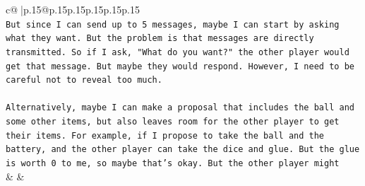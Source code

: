 \documentclass{article}
\begin{document}
{\begin{supertabular}{c@{$\;$}|p{.15\linewidth}@{}p{.15\linewidth}p{.15\linewidth}p{.15\linewidth}p{.15\linewidth}p{.15\linewidth}}
{{{\\ 
\texttt{But since I can send up to 5 messages, maybe I can start by asking what they want. But the problem is that messages are directly transmitted. So if I ask, "What do you want?" the other player would get that message. But maybe they would respond. However, I need to be careful not to reveal too much.} \\
\\ 
\texttt{Alternatively, maybe I can make a proposal that includes the ball and some other items, but also leaves room for the other player to get their items. For example, if I propose to take the ball and the battery, and the other player can take the dice and glue. But the glue is worth 0 to me, so maybe that's okay. But the other player might} \\
            }
        }
    }
    & & \\ \\


\end{supertabular}}
\end{document}
